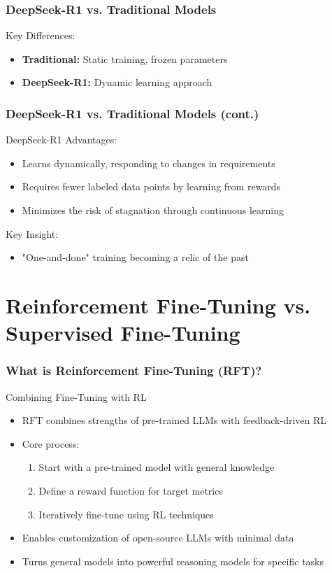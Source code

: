 \documentclass[aspectratio=169]{beamer}
\begin{document}
\begin{frame}[shrink=20]
	\frametitle{DeepSeek-R1 vs. Traditional Models}
	\vspace{-0.2cm}
	\begin{block}{Key Differences:}
		\setlength{\itemsep}{0.5em}
		\begin{itemize}
			\item \textbf{Traditional:} Static training, frozen parameters
			\item \textbf{DeepSeek-R1:} Dynamic learning approach
		\end{itemize}
	\end{block}
\end{frame}

\begin{frame}
	\frametitle{DeepSeek-R1 vs. Traditional Models (cont.)}
	\begin{block}{DeepSeek-R1 Advantages:}
		\begin{itemize}
			\item Learns dynamically, responding to changes in requirements
			\item Requires fewer labeled data points by learning from rewards
			\item Minimizes the risk of stagnation through continuous learning
		\end{itemize}
	\end{block}
	\begin{block}{Key Insight:}
		\begin{itemize}
			\item "One-and-done" training becoming a relic of the past
		\end{itemize}
	\end{block}
\end{frame}

\section{Reinforcement Fine-Tuning vs. Supervised Fine-Tuning}

\begin{frame}
	\frametitle{What is Reinforcement Fine-Tuning (RFT)?}
	\begin{block}{Combining Fine-Tuning with RL}
		\begin{itemize}
			\item RFT combines strengths of pre-trained LLMs with feedback-driven RL
			\item Core process:
			\begin{enumerate}
				\item Start with a pre-trained model with general knowledge
				\item Define a reward function for target metrics
				\item Iteratively fine-tune using RL techniques
			\end{enumerate}
			\item Enables customization of open-source LLMs with minimal data
			\item Turns general models into powerful reasoning models for specific tasks
		\end{itemize}
	\end{block}
\end{frame}
\end{document}
